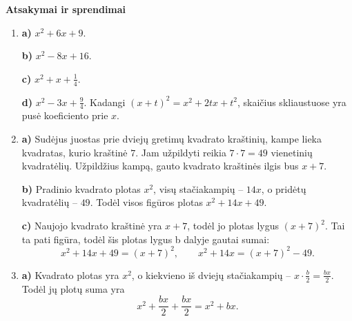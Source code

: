 \documentclass[12pt,a4paper]{article}
\begin{document}
\newpage
\begin{center}{\Large\bfseries Atsakymai ir sprendimai}\end{center}
\begin{enumerate}
\item \textbf{a)} $x^2+6x+9$.

\textbf{b)} $x^2-8x+16$.

\textbf{c)} $x^2+x+\frac{1}{4}$.

\textbf{d)} $x^2-3x+\frac{9}{4}$. Kadangi $(x+t)^2=x^2+2tx+t^2$, skaičius skliaustuose yra pusė koeficiento prie $x$.
\item \textbf{a)} Sudėjus juostas prie dviejų gretimų kvadrato kraštinių, kampe lieka kvadratas, kurio kraštinė $7$. Jam užpildyti reikia $7\cdot7=49$ vienetinių kvadratėlių. Užpildžius kampą, gauto kvadrato kraštinės ilgis bus $x+7$.

\begin{center}
\end{center}
\textbf{b)} Pradinio kvadrato plotas $x^2$, visų stačiakampių – $14x$, o pridėtų kvadratėlių – $49$. Todėl visos figūros plotas $x^2+14x+49$.

\textbf{c)} Naujojo kvadrato kraštinė yra $x+7$, todėl jo plotas lygus $(x+7)^2$. Tai ta pati figūra, todėl šis plotas lygus b dalyje gautai sumai:
\[
x^2+14x+49=(x+7)^2,\qquad
x^2+14x=(x+7)^2-49.
\]
\item \textbf{a)} Kvadrato plotas yra $x^2$, o kiekvieno iš dviejų stačiakampių – $x\cdot\frac{b}{2}=\frac{bx}{2}$. Todėl jų plotų suma yra
\[
x^2+\frac{bx}{2}+\frac{bx}{2}=x^2+bx.
\]


\end{enumerate}
\end{document}
